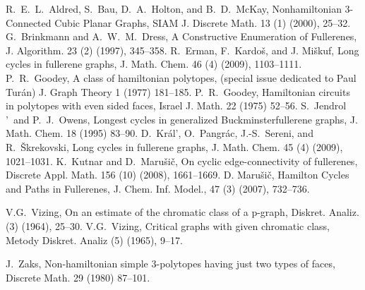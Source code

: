 \documentclass[10pt,a4paper]{article}
\begin{document}
\begin{thebibliography}{99}
 R.~E.~L.~Aldred, S.~Bau, D.~A.~Holton, and B.~D.~McKay,	
Nonhamiltonian 3-Connected Cubic Planar Graphs,
SIAM J. Discrete Math. 13 (1) (2000), 25--32.
 G.~Brinkmann and A.~W.~M.~Dress, A Constructive Enumeration of Fullerenes, J. Algorithm. 23 (2) (1997), 345--358.
 R.~Erman, F.~Kardo\v s, and J. Mi\v skuf, Long cycles in fullerene graphs, J. Math. Chem. 46 (4) (2009), 1103--1111.
 P.~R.~Goodey, A class of hamiltonian polytopes, (special issue dedicated to Paul Tur\'{a}n) J. Graph Theory 1 (1977) 181--185.
 P.~R.~Goodey, Hamiltonian circuits in polytopes with even sided faces, Israel J. Math. 22 (1975) 52--56.
 S.~Jendrol$\!$'~and P.~J.~Owens, {Longest cycles in generalized Buckminsterfullerene graphs}, J. Math. Chem. {18} (1995) 83--90.
 D.~Kr\'al$\!$', O.~Pangr\'ac, J.-S.~Sereni, and R.~\v Skrekovski, Long cycles in fullerene graphs, J. Math. Chem. 45 (4) (2009), 1021--1031.
 K.~Kutnar and D.~Maru\v si\v c, On cyclic edge-connectivity of fullerenes, Discrete Appl. Math. 156 (10) (2008), 1661--1669.
 D. Maru\v si\v c, {Hamilton Cycles and Paths in Fullerenes}, J. Chem. Inf. Model., {47} (3) (2007), 732--736. 

 V.G.~Vizing, On an estimate of the chromatic class of a p-graph, Diskret. Analiz. (3) (1964), 25--30.
 V.G.~Vizing, Critical graphs with given chromatic class, Metody Diskret. Analiz (5) (1965), 9--17.

 J.~Zaks, Non-hamiltonian simple 3-polytopes having just two types of faces, Discrete Math. 29 (1980) 87--101.

\end{thebibliography}
\end{document}
